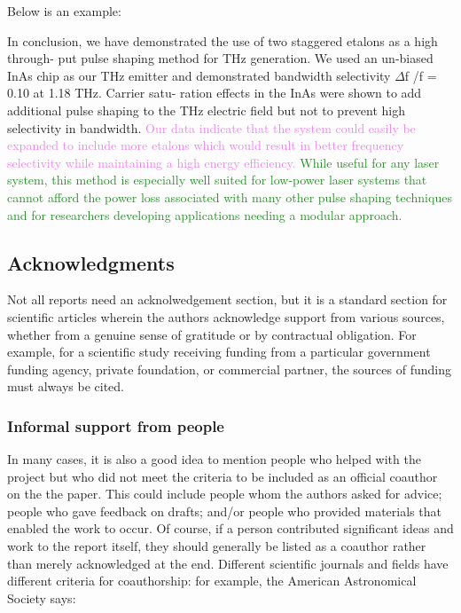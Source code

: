 \documentclass[12pt]{article}
\begin{document}
Below is an example:

\textcolor{BurntOrange}{In conclusion, we have demonstrated the use of
  two staggered etalons as a high through- put pulse shaping method
  for THz generation. We used an un-biased InAs chip as our THz
  emitter and demonstrated bandwidth selectivity $\Delta$f /f = 0.10
  at 1.18 THz. Carrier satu- ration effects in the InAs were shown to
  add additional pulse shaping to the THz electric field but not to
  prevent high selectivity in bandwidth.} \textcolor{violet}{Our data
  indicate that the system could easily be expanded to include more
  etalons which would result in better frequency selectivity while
  maintaining a high energy efficiency.} \textcolor{ForestGreen}{While
  useful for any laser system, this method is especially well suited
  for low-power laser systems that cannot afford the power loss
  associated with many other pulse shaping techniques and for
  researchers developing applications needing a modular approach.}

\newpage

\subsection{Acknowledgments}
\label{sec:Acknowledgments}

Not all reports need an acknolwedgement section, but it is a standard 
section for scientific articles wherein the authors acknowledge support
from various sources, whether from a genuine sense of gratitude or by
contractual obligation. For example, for a scientific study receiving
funding from a particular government funding agency, private foundation, 
or commercial partner, the sources of funding must always be cited.

\subsubsection{Informal support from people}

In many cases, it is also a good idea to mention people who helped with
the project but who did not meet the criteria
to be included as an official coauthor on the the paper. This could include
people whom the authors asked for advice; people who gave feedback on drafts; and/or 
people who provided materials that enabled the work to occur. Of course, if a person
contributed significant ideas and work to the report itself, they should generally be
listed as a coauthor rather than merely acknowledged at the end. Different scientific
journals and fields have different criteria for coauthorship: for example, the
American Astronomical Society says:
\end{document}
